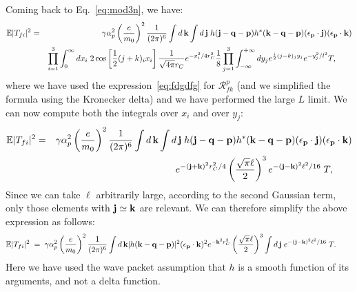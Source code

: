\documentclass[12pt,onecolumn,amssymb,nofootinbib]{revtex4-2} %
\begin{document}
Coming back to Eq.~\eqref{eq:mod3n}, we have:
\begin{eqnarray}
\mathbb{E}|T_{fi}|^{2} & = & \gamma \alpha_p^2 \left( \frac{e}{m_0} \right)^2 \frac{1}{(2\pi)^6} \int d\, {\bf k} \int d\, {\bf j}\; h({\bf j} - {\bf q} - {\bf p}) h^{*}({\bf k} - {\bf q} - {\bf p}) (\mathbf{\epsilon_{p}}\cdot \mathbf{j}) (\mathbf{\epsilon_{p}}\cdot \mathbf{k}) \nonumber \\
& & \prod_{i=1}^{3}\int_{0}^{\infty}dx_{i}\; 2\cos\left[\frac{1}{2}(j+k)_i x_i \right] \frac{1}{\sqrt{4\pi}r_C}e^{-x_i^2/4r_C^2} \frac{1}{8} \prod_{j=1}^{3}\int_{-\infty}^{+\infty}dy_{j} e^{\frac{i}{2}(j-k)_j y_j} e^{-y_j^2/l^{2}} T, \qquad
\end{eqnarray}
where we have used the expression~\eqref{eq:fdgdfg} for ${\mathcal R}_{fk}^{p}$ (and we simplified the formula using the Kronecker delta) and we have performed the large $L$ limit. We can now compute both the integrals over $x_i$ and over $y_j$:
\begin{eqnarray}
\mathbb{E}|T_{fi}|^{2} & = & \gamma \alpha_p^2 \left( \frac{e}{m_0} \right)^2 \frac{1}{(2\pi)^6} \int d\, {\bf k} \int d\, {\bf j}\; h({\bf j} - {\bf q} - {\bf p}) h^{*}({\bf k} - {\bf q} - {\bf p}) (\mathbf{\epsilon_{p}}\cdot \mathbf{j}) (\mathbf{\epsilon_{p}}\cdot \mathbf{k}) \nonumber \\
& & e^{-({\bf j} + {\bf k})^2 r_C^2/4} \left( \frac{\sqrt{\pi} \ell}{2} \right)^3 e^{- ({\bf j} - {\bf k})^2 \ell^2 / 16}\;T, \qquad
\end{eqnarray}
Since we can take $\ell$ arbitrarily large, according to the second Gaussian term, only those elements with ${\bf j} \simeq {\bf k}$ are relevant. We can therefore simplify the above expression as follows:
\begin{equation}
\mathbb{E}|T_{fi}|^{2} \; = \; \gamma \alpha_p^2 \left( \frac{e}{m_0} \right)^2 \frac{1}{(2\pi)^6} \int d\, {\bf k} |h({\bf k} - {\bf q} - {\bf p})|^2  (\mathbf{\epsilon_{p}}\cdot \mathbf{k})^2 e^{-{\bf k}^2 r_C^2} \left( \frac{\sqrt{\pi} \ell}{2} \right)^3 \int d\, {\bf j}\;  e^{- ({\bf j} - {\bf k})^2 \ell^2 / 16}\;T. \qquad
\end{equation}
Here we have used the wave packet assumption that $h$ is a smooth function of its arguments, and not a delta function.  
\end{document}
